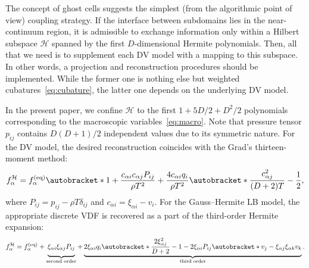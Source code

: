 \documentclass{article}
\DeclarePairedDelimiter\autobracket()       %
\newcommand{\br}[1]{\autobracket*{#1}}
\newcommand{\xiai}{\xi_{\alpha i}}
\newcommand{\xiaj}{\xi_{\alpha j}}
\newcommand{\xiak}{\xi_{\alpha k}}
\newcommand{\cai}{c_{\alpha i}}
\newcommand{\caj}{c_{\alpha j}}
\newcommand{\equil}[1]{#1^\mathrm{(eq)}}
\begin{document}
The concept of ghost cells suggests the simplest (from the algorithmic point of view) coupling strategy.
If the interface between subdomains lies in the near-continuum region,
it is admissible to exchange information only within a Hilbert subspace \(\mathcal{H}\)
spanned by the first \(D\)-dimensional Hermite polynomials.
Then, all that we need is to supplement each DV model with a mapping to this subspace.
In other words, a projection and reconstruction procedures should be implemented.
While the former one is nothing else but weighted cubatures~\eqref{eq:cubature},
the latter one depends on the underlying DV model.

In the present paper, we confine \(\mathcal{H}\) to the first \(1+5D/2+D^2/2\) polynomials
corresponding to the macroscopic variables~\eqref{eq:macro}.
Note that pressure tensor \(p_{ij}\) contains \(D(D+1)/2\) independent values due to its symmetric nature.
For the DV model, the desired reconstruction coincides with the Grad's thirteen-moment method:
\begin{equation}\label{eq:interface_dvm}
    f^{\mathcal{H}}_\alpha = \equil{f}_\alpha\br{
        1 + \frac{\cai\caj P_{ij}}{\rho T^2} + \frac{4\cai q_i}{\rho T^2}\br{\frac{\caj^2}{(D+2)T} - \frac12} },
\end{equation}
where \(P_{ij} = p_{ij} - \rho T\delta_{ij}\) and \(\cai = \xiai - v_i\).
For the Gauss--Hermite LB model, the appropriate discrete VDF is recovered as a part of the third-order Hermite expansion:
\begin{equation}\label{eq:interface_lbm}
    f^{\mathcal{H}}_\alpha = \equil{f}_\alpha + \underbrace{ \vphantom{ \br{\frac{2\xiaj^2}{D+2}-1} }
        \xiai\xiaj P_{ij}
    }_\text{second order} + \underbrace{
        2\xiai q_i\br{\frac{2\xiaj^2}{D+2}-1} - 2\xiai P_{ij}\br{ v_j - \xiaj\xiak v_k }
    }_\text{third order}.
\end{equation}
\end{document}
